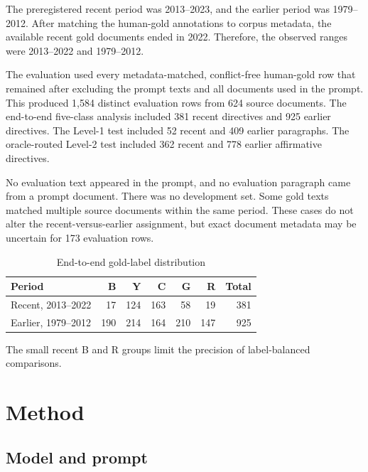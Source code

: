 \documentclass[11pt]{article}
\begin{document}
The preregistered recent period was 2013--2023, and the earlier period was 1979--2012. After matching the human-gold annotations to corpus metadata, the available recent gold documents ended in 2022. Therefore, the observed ranges were 2013--2022 and 1979--2012.

The evaluation used every metadata-matched, conflict-free human-gold row that remained after excluding the prompt texts and all documents used in the prompt. This produced 1,584 distinct evaluation rows from 624 source documents. The end-to-end five-class analysis included 381 recent directives and 925 earlier directives. The Level-1 test included 52 recent and 409 earlier paragraphs. The oracle-routed Level-2 test included 362 recent and 778 earlier affirmative directives.

No evaluation text appeared in the prompt, and no evaluation paragraph came from a prompt document. There was no development set. Some gold texts matched multiple source documents within the same period. These cases do not alter the recent-versus-earlier assignment, but exact document metadata may be uncertain for 173 evaluation rows.

\begin{table}[ht]
\centering
\caption{End-to-end gold-label distribution}
\label{tab:distribution}
\begin{threeparttable}
\begin{tabular}{lrrrrrr}
\toprule
Period & B & Y & C & G & R & Total \\
\midrule
Recent, 2013--2022 & 17 & 124 & 163 & 58 & 19 & 381 \\
Earlier, 1979--2012 & 190 & 214 & 164 & 210 & 147 & 925 \\
\bottomrule
\end{tabular}
\begin{tablenotes}[flushleft]\footnotesize
\item The small recent B and R groups limit the precision of label-balanced comparisons.
\end{tablenotes}
\end{threeparttable}
\end{table}

\section{Method}

\subsection{Model and prompt}
\end{document}

